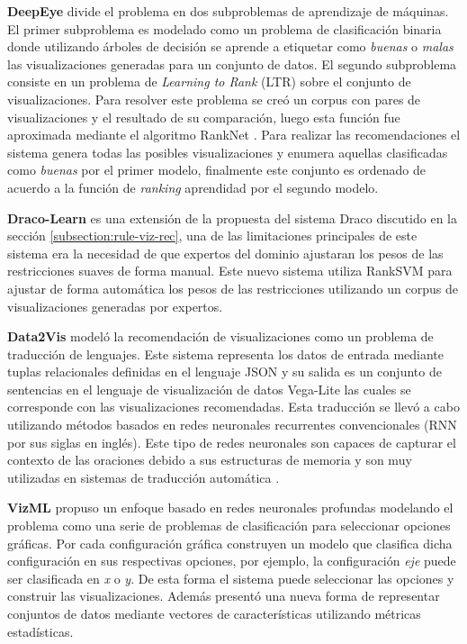\textbf{DeepEye} \cite{luo2018deepeye} divide el problema en dos subproblemas de aprendizaje de m\'aquinas. El primer subproblema es modelado
como un problema de clasificaci\'on binaria donde utilizando \'arboles de decisi\'on se aprende a etiquetar 
como \textit{buenas} o \textit{malas} las visualizaciones generadas para un conjunto de datos. 
El segundo subproblema consiste en un problema de \textit{Learning to Rank} (LTR) sobre el conjunto de visualizaciones. 
Para resolver este problema se cre\'o un corpus con pares de visualizaciones y el resultado de su comparaci\'on, luego esta funci\'on fue aproximada
mediante el algoritmo RankNet \cite{luo2018deepeye}. Para realizar las recomendaciones el sistema genera todas las posibles visualizaciones y enumera
aquellas clasificadas como \textit{buenas} por el primer modelo, finalmente este conjunto es ordenado de acuerdo a la funci\'on de \textit{ranking} aprendidad por
el segundo modelo. 

 

\textbf{Draco-Learn} \cite{moritz2018draco} es una extensi\'on de la propuesta del sistema Draco discutido en la
secci\'on \ref{subsection:rule-viz-rec}, una de las limitaciones principales de este sistema era la necesidad
de que expertos del dominio ajustaran los pesos de las restricciones suaves de forma manual. Este nuevo sistema
utiliza RankSVM para ajustar de forma autom\'atica los pesos de las restricciones utilizando un corpus de visualizaciones
generadas por expertos.


\textbf{Data2Vis} \cite{dibia2019data2vis} model\'o la recomendaci\'on de visualizaciones como un problema de
traducci\'on de lenguajes. Este sistema representa los datos de entrada mediante tuplas
relacionales definidas en el lenguaje JSON y su salida es un conjunto de sentencias
en el lenguaje de visualizaci\'on de datos Vega-Lite las cuales se corresponde con las
visualizaciones recomendadas. Esta traducci\'on se llev\'o a cabo utilizando m\'etodos
basados en redes neuronales recurrentes convencionales (RNN por sus siglas en ingl\'es).
Este tipo de redes neuronales son capaces de capturar el contexto de las oraciones debido
a sus estructuras de memoria y son muy utilizadas en sistemas de traducci\'on autom\'atica \cite{sutskever2014sequence}.

\textbf{VizML} \cite{hu2019vizml} propuso un enfoque basado en redes neuronales profundas modelando
el problema como una serie de problemas de clasificaci\'on para seleccionar opciones gr\'aficas. Por cada
configuraci\'on gr\'afica construyen un modelo que clasifica dicha configuraci\'on en sus respectivas opciones, por ejemplo,
la configuraci\'on \textit{eje} puede ser clasificada en \textit{x} o \textit{y}. De esta forma el sistema puede
seleccionar las opciones y construir las visualizaciones. Adem\'as
present\'o una nueva forma de representar conjuntos de datos mediante vectores de caracter\'isticas utilizando
m\'etricas estad\'isticas.

